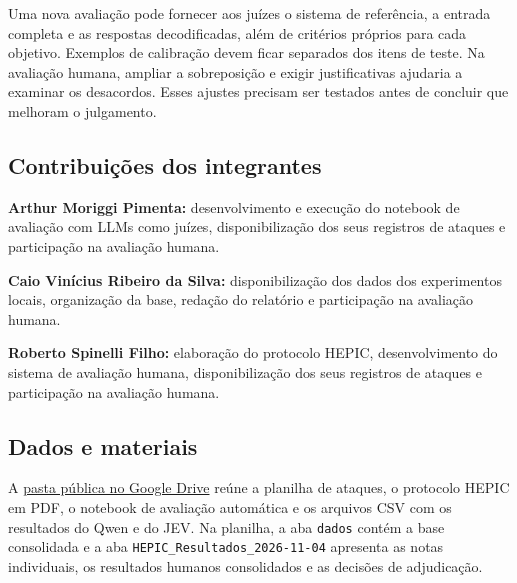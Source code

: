 \documentclass{sbc2023}
\begin{document}
Uma nova avaliação pode fornecer aos juízes o sistema de referência, a entrada completa e as respostas decodificadas, além de critérios próprios para cada objetivo. Exemplos de calibração devem ficar separados dos itens de teste. Na avaliação humana, ampliar a sobreposição e exigir justificativas ajudaria a examinar os desacordos. Esses ajustes precisam ser testados antes de concluir que melhoram o julgamento.

\par\addvspace{10pt}
\noindent\begin{minipage}{\columnwidth}
\subsection*{Contribuições dos integrantes}
\textbf{Arthur Moriggi Pimenta:} desenvolvimento e execução do notebook de avaliação com LLMs como juízes, disponibilização dos seus registros de ataques e participação na avaliação humana.\par
\textbf{Caio Vinícius Ribeiro da Silva:} disponibilização dos dados dos experimentos locais, organização da base, redação do relatório e participação na avaliação humana.\par
\textbf{Roberto Spinelli Filho:} elaboração do protocolo HEPIC, desenvolvimento do sistema de avaliação humana, disponibilização dos seus registros de ataques e participação na avaliação humana.
\end{minipage}

\par\addvspace{10pt}
\noindent\begin{minipage}{\columnwidth}
\subsection*{Dados e materiais}
A \href{https://drive.google.com/drive/folders/1MtFY4XPaf2Zg-MkHYEF9YyVR8DU0lz11}{pasta pública no Google Drive} reúne a planilha de ataques, o protocolo HEPIC em PDF, o notebook de avaliação automática e os arquivos CSV com os resultados do Qwen e do JEV. Na planilha, a aba \texttt{dados} contém a base consolidada e a aba \texttt{HEPIC\_Resultados\_2026-11-04} apresenta as notas individuais, os resultados humanos consolidados e as decisões de adjudicação.

\end{minipage}



\end{document}
